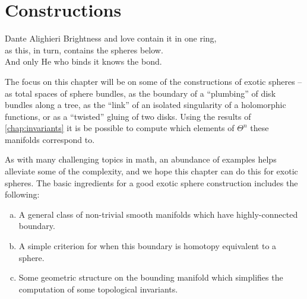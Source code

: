 \chapter{Constructions}\label{chap:constructions}
%


\begin{epigraph}{19em}{Dante Alighieri}
Brightness and love contain it in one ring,\\
as this, in turn, contains the spheres below.\\
And only He who binds it knows the bond.\\
\end{epigraph}

The focus on this chapter will be on some of the constructions of exotic spheres -- as total spaces of sphere bundles, as the boundary of a ``plumbing'' of disk bundles along a tree, as the ``link'' of an isolated singularity of a holomorphic functions, or as a ``twisted'' gluing of two disks. Using the results of \cref{chap:invariants} it is be possible to compute which elements of $\Theta^n$ these manifolds correspond to.

As with many challenging topics in math, an abundance of examples helps alleviate some of the complexity, and we hope this chapter can do this for exotic spheres.
The basic ingredients for a good exotic sphere construction includes the following:
\begin{enumerate}[(a)]
	\item A general class of non-trivial smooth manifolds which have highly-connected boundary.
	\item A simple criterion for when this boundary is homotopy equivalent to a sphere.
	\item Some geometric structure on the bounding manifold which simplifies the computation of some topological invariants.
\end{enumerate}





